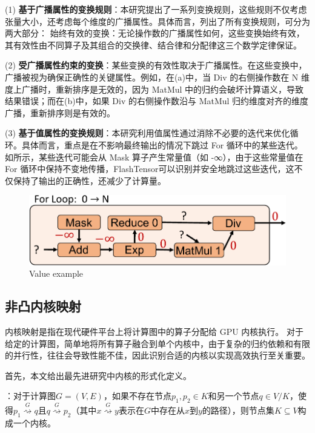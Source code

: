 (1) \textbf{基于广播属性的变换规则}：本研究提出了一系列变换规则，这些规则不仅考虑张量大小，还考虑每个维度的广播属性。具体而言，列出了所有变换规则，可分为两大部分：
始终有效的变换：无论操作数的广播属性如何，这些变换始终有效，其有效性由不同算子及其组合的交换律、结合律和分配律这三个数学定律保证。

(2) \textbf{受广播属性约束的变换}：某些变换的有效性取决于广播属性。在这些变换中，广播被视为确保正确性的关键属性。例如，在(a)中，当 Div 的右侧操作数在 N 维度上广播时，重新排序是无效的，因为 MatMul 中的归约会破坏计算语义，导致结果错误；而在(b)中，如果 Div 的右侧操作数沿与 MatMul 归约维度对齐的维度广播，重新排序则是有效的。

(3) \textbf{基于值属性的变换规则}：本研究利用值属性通过消除不必要的迭代来优化循环。具体而言，重点是在不影响最终输出的情况下跳过 For 循环中的某些迭代。如所示，某些迭代可能会从 Mask 算子产生常量值（如 -∞），由于这些常量值在 For 循环中保持不变地传播，FlashTensor可以识别并安全地跳过这些迭代，这不仅保持了输出的正确性，还减少了计算量。

\begin{figure}[h]
    \centering
    \includegraphics[width=0.7\linewidth]{figures/flashtensor/value_example-crop.pdf}
    \caption{Value example}
    \label{fig:value_example}
\end{figure}


\subsection{非凸内核映射}
内核映射是指在现代硬件平台上将计算图中的算子分配给 GPU 内核执行。
对于给定的计算图，简单地将所有算子融合到单个内核中，由于复杂的归约依赖和有限的并行性，往往会导致性能不佳，因此识别合适的内核以实现高效执行至关重要。

首先，本文给出最先进研究中内核的形式化定义。

\vspace{0.5em}
\begin{definition}[内核]：对于计算图\(G=(V, E)\)，如果不存在节点\(p_{1}, p_{2} \in K\)和另一个节点\(q \in V/K\)，使得\(p_{1} \stackrel{G}{\rightsquigarrow } q\)且\(q \stackrel{G}{\rightsquigarrow} p_{2}\)（其中\(x \stackrel{G}{\rightsquigarrow} y\)表示在\(G\)中存在从\(x\)到\(y\)的路径），则节点集\(K \subseteq V\)构成一个内核。
\end{definition}
\vspace{0.5em}

